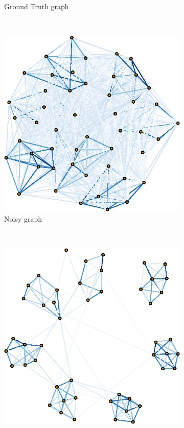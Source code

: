 \begin{figure}[!htb]
\begin{subfigure}[b]{0.3\textwidth}
        \caption{Ground Truth graph}
    \end{subfigure}
    ~ %
    \begin{subfigure}[b]{0.3\textwidth}
        \includegraphics[width=\textwidth]{model-mismatch/noisy_graph.eps}
        \caption{Noisy graph}
    \end{subfigure}
    ~ %
    \begin{subfigure}[b]{0.3\textwidth}
        \includegraphics[width=\textwidth]{model-mismatch/est_graph.eps}

\end{subfigure}
\end{figure}
